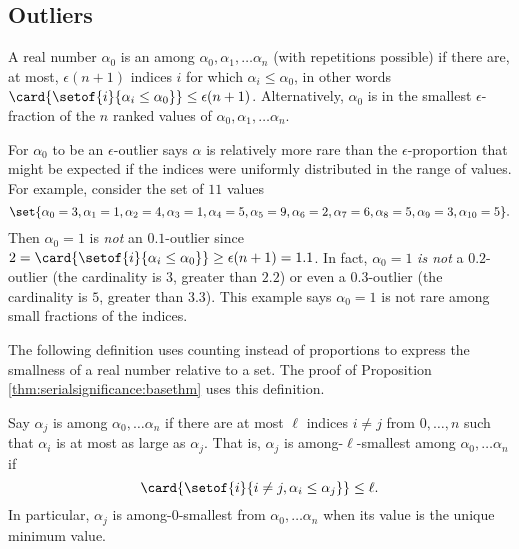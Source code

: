 \documentclass[12pt]{article}
\begin{document}
\subsection*{Outliers}

\begin{definition}
    A real number \( \alpha_0 \) is an %
    among \( \alpha_0, \alpha_1, \dots \alpha_n \) (with repetitions
    possible) if there are, at most, \( \epsilon(n + 1) \) indices \( i \)
    for which \( \alpha_i \le \alpha_0 \), in other words \( \card{%
    \setof{i}{\alpha_i \le \alpha_0}} \le \epsilon(n+1) \).
    Alternatively, \( \alpha_0 \) is in the smallest \( \epsilon \)-fraction
    of the \( n \) ranked values of \( \alpha_0, \alpha_1, \dots \alpha_n
    \).
\end{definition}

\begin{remark}
    For \( \alpha_0 \) to be an \( \epsilon \)-outlier says \( \alpha \)
    is relatively more rare than the \( \epsilon \)-proportion that
    might be expected if the indices were uniformly distributed in the
    range of values.  For example, consider the set of \( 11 \) values
    \[
    \set{\alpha_0 = 3, \alpha_1 = 1, \alpha_2 = 4, \alpha_3 = 1, \alpha_4
    = 5, \alpha_5 = 9, \alpha_6 = 2, \alpha_7 = 6, \alpha_8 = 5, \alpha_9
    = 3, \alpha_{10} = 5}.
    \]  Then \( \alpha_0 = 1 \) is \emph{not} an \(
    0.1 \)-outlier since \( 2 = \card{%
    \setof{i}{\alpha_i \le \alpha_0}} \ge \epsilon(n+1) = 1.1 \).  In
    fact, \( \alpha_0 = 1 \) \emph{is not} a \( 0.2 \)-outlier (the
    cardinality is \( 3 \), greater than \( 2.2 \)) or even a \( 0.3 \)-outlier
    (the cardinality is \( 5 \), greater than \( 3.3 \)).  This example
    says \( \alpha_0 = 1 \) is not rare among small fractions of the
    indices.

\end{remark}

The following definition uses counting instead of proportions to express
the smallness of a real number relative to a set.  The proof of
Proposition~%
\ref{thm:serialsignificance:basethm} uses this definition.

\begin{definition}
    Say \( \alpha_j \) is %
    among \( \alpha_0, \dots \alpha_n \) if there are at most \( \ell \)
    indices \( i \ne j \) from \( 0, \dots, n \) such that \( \alpha_i \)
    is at most as large as \( \alpha_j \).  That is, \( \alpha_j \) is
    among-\( \ell \)-smallest among \( \alpha_0, \dots \alpha_n \) if
    \[
        \card{ \setof{i}{i \ne j, \alpha_i \le \alpha_j}} \le \ell.
    \] In particular, \( \alpha_j \) is among-\( 0 \)-smallest from \(
    \alpha_0, \dots \alpha_n \) when its value is the unique minimum
    value.
\end{definition}
\end{document}
